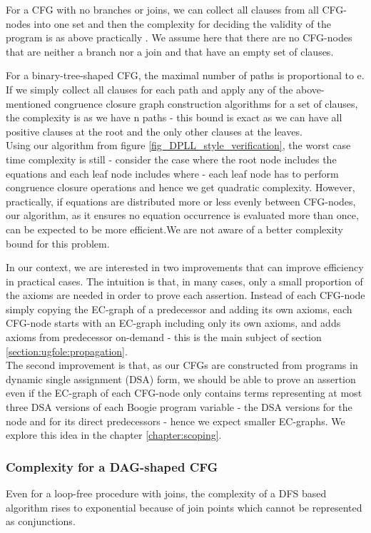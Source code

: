 For a CFG with no branches or joins, we can collect all clauses from all CFG-nodes into one set and then the complexity for deciding the validity of the program is as above practically . We assume here that there are no CFG-nodes that are neither a branch nor a join and that have an empty set of clauses.

For a binary-tree-shaped CFG, the maximal number of paths is proportional to e.
If we simply collect all clauses for each path and apply any of the above-mentioned congruence closure graph construction algorithms for a set of clauses, the complexity is  as we have n paths - this bound is exact as we can have all positive clauses at the root and the only other clauses at the leaves.\\
Using our algorithm from figure \ref{fig_DPLL_style_verification}, the worst case time complexity is still
 - consider the case where the root node includes the equations  and each leaf node includes  where  - each leaf node has to perform  congruence closure operations and hence we get quadratic complexity. 
However, practically, if equations are distributed more or less evenly between CFG-nodes, our algorithm, as it ensures no equation occurrence is evaluated more than once, can be expected to be more efficient.We are not aware of a better complexity bound for this problem. 

In our context, we are interested in two improvements that can improve efficiency in practical cases.
The intuition is that, in many cases, only a small proportion of the axioms are needed in order to prove each assertion.
Instead of each CFG-node simply copying the EC-graph of a predecessor and adding its own axioms, each CFG-node starts with an EC-graph including only its own axioms, and adds axioms from predecessor on-demand - this is the main subject of section 
\ref{section:ugfole:propagation}.\\
The second improvement is that, as our CFGs are constructed from programs in dynamic single assignment (DSA) form, we should be able to prove an assertion even if the EC-graph of each CFG-node only contains terms representing at most three DSA versions of each Boogie program variable - the DSA versions for the node and for its direct predecessors - hence we expect smaller EC-graphs. 
We explore this idea in the chapter \ref{chapter:scoping}. 

\subsubsection*{Complexity for a DAG-shaped CFG}
Even for a loop-free procedure with joins, the complexity of a DFS based algorithm rises to exponential because of join points which cannot be represented as conjunctions.

